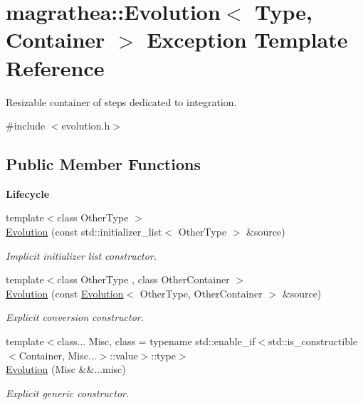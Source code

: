 \hypertarget{exceptionmagrathea_1_1Evolution}{\section{magrathea\-:\-:Evolution$<$ Type, Container $>$ Exception Template Reference}
\label{exceptionmagrathea_1_1Evolution}
}


Resizable container of steps dedicated to integration.  




{\ttfamily \#include $<$evolution.\-h$>$}

\subsection*{Public Member Functions}
\begin{Indent}{\bf Lifecycle}\par
\begin{DoxyCompactItemize}
\item 
{\footnotesize template$<$class Other\-Type $>$ }\\\hyperlink{exceptionmagrathea_1_1Evolution_ac65701beda61f229f3c3571f65577cec}{Evolution} (const std\-::initializer\-\_\-list$<$ Other\-Type $>$ \&source)
\begin{DoxyCompactList}\small\item\em Implicit initializer list constructor. \end{DoxyCompactList}\item 
{\footnotesize template$<$class Other\-Type , class Other\-Container $>$ }\\\hyperlink{exceptionmagrathea_1_1Evolution_ae4bca2889026beff6babdbca19295f36}{Evolution} (const \hyperlink{exceptionmagrathea_1_1Evolution}{Evolution}$<$ Other\-Type, Other\-Container $>$ \&source)
\begin{DoxyCompactList}\small\item\em Explicit conversion constructor. \end{DoxyCompactList}\item 
{\footnotesize template$<$class... Misc, class  = typename std\-::enable\-\_\-if$<$std\-::is\-\_\-constructible$<$\-Container, Misc...$>$\-::value$>$\-::type$>$ }\\\hyperlink{exceptionmagrathea_1_1Evolution_afed56ad82b3c043a5633d1277dde0601}{Evolution} (Misc \&\&...misc)
\begin{DoxyCompactList}\small\item\em Explicit generic constructor. \end{DoxyCompactList}\end{DoxyCompactItemize}
\end{Indent}
